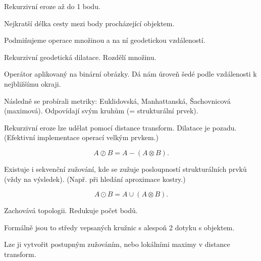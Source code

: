 \documentclass[12pt]{article}					%
\begin{document}
\begin{definice}
	Rekurzivní eroze až do 1 bodu.
\end{definice}

\begin{definice}
	Nejkratší délka cesty mezi body procházející objektem.
\end{definice}

\begin{definice}
	Podmiňujeme operace množinou a na ní geodetickou vzdáleností.
\end{definice}

\begin{definice}
	Rekurzivní geodetická dilatace. Rozdělí množinu.
\end{definice}

\begin{definice}
	Operátor aplikovaný na binární obrázky. Dá nám úroveň šedé podle vzdálenosti k nejbližšímu okraji.
\end{definice}

\begin{definice}
	Následně se probírali metriky: Euklidovská, Manhattanská, Šachovnicová (maximová). Odpovídají svým kruhům (= strukturální prvek).
\end{definice}

\begin{poznamka}
	Rekurzivní eroze lze udělat pomocí distance transform. Dilatace je pozadu. (Efektivní implementace operací velkým prvkem.)
\end{poznamka}

\begin{definice}[Zúžení]
	$$ A \oslash B = A - (A \otimes B). $$
	
	Existuje i sekvenční zužování, kde se zužuje posloupností strukturálních prvků (vždy na výsledek). (Např. při hledání aproximace kostry.)
\end{definice}

\begin{definice}[Rozšíření]
	$$ A \odot B = A \cup (A \otimes B). $$
\end{definice}

\begin{definice}[Kostra]
	Zachovává topologii. Redukuje počet bodů.

	Formálně jsou to středy vepsaných kružnic s alespoň 2 dotyku s objektem.

	Lze ji vytvořit postupným zužováním, nebo lokálními maximy v distance transform.
\end{definice}
\end{document}

